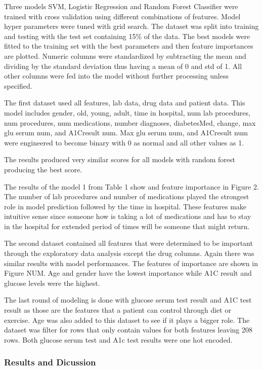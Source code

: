 \documentclass[5p]{elsarticle} %
\begin{document}
Three models SVM, Logistic Regression and Random Forest Classifier were
trained with cross validation using different combinations of features.
Model hyper parameters were tuned with grid search. The dataset was
split into training and testing with the test set containing 15\% of the
data. The best models were fitted to the training set with the best
parameters and then feature importances are plotted. Numeric columns
were standardized by subtracting the mean and dividing by the standard
deviation thus having a mean of 0 and std of 1. All other columns were
fed into the model without further processing unless specified.

The first dataset used all features, lab data, drug data and patient
data. This model includes gender, old, young, adult, time in hospital,
num lab procedures, num procedures, num medications, number diagnoses,
diabetesMed, change, max glu serum num, and A1Cresult num. Max glu serum
num, and A1Cresult num were engineered to become binary with 0 as normal
and all other values as 1.

The results produced very similar scores for all models with random
forest producing the best score.

The results of the model 1 from Table 1 show and feature importance in
Figure 2. The number of lab procedures and number of medications played
the strongest role in model prediction followed by the time in hospital.
These features make intuitive sense since someone how is taking a lot of
medications and has to stay in the hospital for extended period of times
will be someone that might return.

The second dataset contained all features that were determined to be
important through the exploratory data analysis except the drug columns.
Again there was similar results with model performances. The features of
importance are shown in Figure NUM. Age and gender have the lowest
importance while A1C result and glucose levels were the highest.

The last round of modeling is done with glucose serum test result and
A1C test result as those are the features that a patient can control
through diet or exercise. Age was also added to this dataset to see if
it plays a bigger role. The dataset was filter for rows that only
contain values for both features leaving 208 rows. Both glucose serum
test and A1c test results were one hot encoded.

\hypertarget{results-and-dicussion}{%
\subsubsection{Results and Dicussion}\label{results-and-dicussion}}
\end{document}
